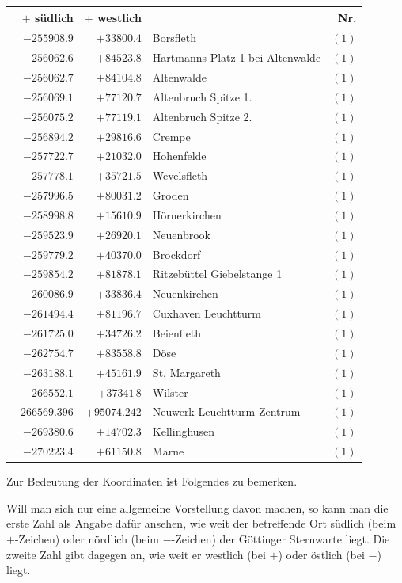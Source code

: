 \begin{center}\begingroup\fontsize{8}{9}\selectfont
\setlength{\tabcolsep}{4pt}
\begin{tabular}{r|r|p{170pt}|r}\hline
\(+\) südlich&\(+\) westlich&&Nr.\\\hline
\(-255908.9\)&\(+33800.4\)&Borsfleth&\((1)\)\\
\(-256062.6\)&\(+84523.8\)&Hartmanns Platz 1 bei Altenwalde&\((1)\)\\
\(-256062.7\)&\(+84104.8\)&Altenwalde&\((1)\)\\
\(-256069.1\)&\(+77120.7\)&Altenbruch Spitze 1.&\((1)\)\\
\(-256075.2\)&\(+77119.1\)&Altenbruch Spitze 2.&\((1)\)\\
\(-256894.2\)&\(+29816.6\)&Crempe&\((1)\)\\
\(-257722.7\)&\(+21032.0\)&Hohenfelde&\((1)\)\\
\(-257778.1\)&\(+35721.5\)&Wevelsfleth&\((1)\)\\
\(-257996.5\)&\(+80031.2\)&Groden&\((1)\)\\
\(-258998.8\)&\(+15610.9\)&Hörnerkirchen&\((1)\)\\
\(-259523.9\)&\(+26920.1\)&Neuenbrook&\((1)\)\\
\(-259779.2\)&\(+40370.0\)&Brockdorf&\((1)\)\\
\(-259854.2\)&\(+81878.1\)&Ritzebüttel Giebelstange 1&\((1)\)\\
\(-260086.9\)&\(+33836.4\)&Neuenkirchen&\((1)\)\\
\(-261494.4\)&\(+81196.7\)&Cuxhaven Leuchtturm&\((1)\)\\
\(-261725.0\)&\(+34726.2\)&Beienfleth&\((1)\)\\
\(-262754.7\)&\(+83558.8\)&Döse&\((1)\)\\
\(-263188.1\)&\(+45161.9\)&St. Margareth&\((1)\)\\
\(-266552.1\)&\(+37341\,8\)&Wilster&\((1)\)\\
\(-266569.396\)&\(+95074.242\)&Neuwerk Leuchtturm Zentrum&\((1)\)\\
\(-269380.6\)&\(+14702.3\)&Kellinghusen&\((1)\)\\
\(-270223.4\)&\(+61150.8\)&Marne&\((1)\)\\
\hline\end{tabular}\endgroup\end{center}

Zur Bedeutung der Koordinaten ist Folgendes zu bemerken.

Will man sich nur eine allgemeine Vorstellung davon machen, so kann man die erste Zahl als Angabe dafür ansehen, wie weit der betreffende Ort südlich (beim \(+\)-Zeichen) oder nördlich (beim \(-\)-Zeichen) der Göttinger Sternwarte liegt. Die zweite Zahl gibt dagegen an, wie weit er westlich (bei \(+\)) oder östlich (bei \(-\)) liegt.


